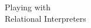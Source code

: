 \thispagestyle{empty}

\begin{fullwidth}
\rmfamily  
\itshape
\noindent\fontsize{20}{24}\selectfont
\thanklessauthor

\vspace{10.5pc}%

\upshape
\noindent\fontsize{36}{38}\selectfont
\nohyphenation
Playing with \\\noindent Relational Interpreters

\normalsize

~\vfill

\end{fullwidth}

